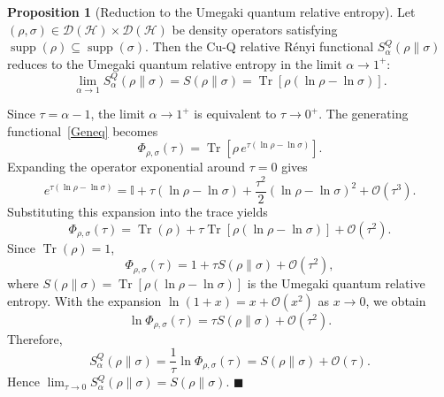 \documentclass[a4paper, amsfonts, amssymb, amsmath, reprint, showkeys, nofootinbib, twoside, aps, pra]{revtex4-2}
\theoremstyle{definition}
\newtheorem{proposition}[theorem]{Proposition}
\renewenvironment{proof}{\noindent{\bfseries Proof.}}{\hfill$\blacksquare$}
\begin{document}
\begin{proposition}[Reduction to the Umegaki quantum relative entropy]\label{prop:classical-reduction}
Let $(\rho,\sigma) \in \mathcal{D}(\mathcal{H}) \times \mathcal{D}(\mathcal{H})$
be density operators satisfying 
$\operatorname{supp}(\rho)\subseteq\operatorname{supp}(\sigma)$.
Then the Cu-Q relative Rényi functional $S_\alpha^Q(\rho\|\sigma)$
reduces to the Umegaki quantum relative entropy in the limit $\alpha\to1^+$:
\begin{equation}
\lim_{\alpha\to1} S^Q_\alpha(\rho\|\sigma)
=
S(\rho\|\sigma) = \operatorname{Tr}\!\left[\rho(\ln\rho-\ln\sigma)\right].
\end{equation}
\end{proposition}

\begin{proof}
Since $\tau=\alpha-1$, the limit
$\alpha\to1^+$ is equivalent to $\tau\to0^+$. The generating functional~\eqref{Geneq} becomes
\begin{equation}
    \Phi_{\rho,\sigma}(\tau)=\operatorname{Tr}\!\left[
    \rho\,e^{\tau(\ln\rho-\ln\sigma)}\right].
\end{equation}
Expanding the operator exponential around $\tau=0$ gives
\begin{equation}
    e^{\tau(\ln\rho-\ln\sigma)}=\mathbb I +\tau(\ln\rho-\ln\sigma)+\frac{\tau^2}{2}(\ln\rho-\ln\sigma)^2+\mathcal O(\tau^3).
\end{equation}
Substituting this expansion into the trace yields
\begin{equation}
    \Phi_{\rho,\sigma}(\tau)=\operatorname{Tr}(\rho)+
    \tau\operatorname{Tr}[\rho(\ln\rho-\ln\sigma)]+
    \mathcal O(\tau^2).
\end{equation}
Since $\operatorname{Tr}(\rho)=1$,
\begin{equation}
\Phi_{\rho,\sigma}(\tau)
=
1+\tau S(\rho\|\sigma)
+\mathcal O(\tau^2),
\end{equation}
where \(S(\rho\|\sigma)=\operatorname{Tr}\!\left[
\rho(\ln\rho-\ln\sigma)\right]\)
is the Umegaki quantum relative entropy.
With the expansion \(\ln(1+x)=x+\mathcal O(x^2)\) as \(x\to0\), we obtain
\begin{equation}
    \ln\Phi_{\rho,\sigma}(\tau)=\tau S(\rho\|\sigma)+
    \mathcal O(\tau^2).
\end{equation}
Therefore,
\begin{equation}
    S_\alpha^Q(\rho\|\sigma)=\frac{1}{\tau} \ln\Phi_{\rho,\sigma}(\tau)=S(\rho\|\sigma)+
    \mathcal O(\tau).
\end{equation}
Hence \(\lim_{\tau\to0} S_\alpha^Q(\rho\|\sigma)= S(\rho\|\sigma). \)
\end{proof}
\end{document}
